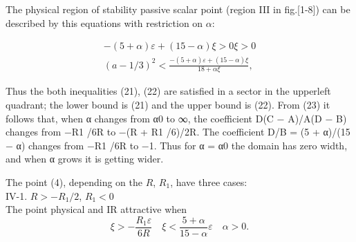 \documentclass[12pt]{article}
\begin{document}
The physical region of stability passive scalar point (region III in fig.[1-8]) can be described 
by this equations with restriction  on $\alpha$:
 

\begin{eqnarray}
-(5+\alpha)\varepsilon +(15-\alpha)\xi>0  \xi>0
\nonumber \\
 (a-1/3)  ^2< \frac{-(5+\alpha)\varepsilon+(15-\alpha)\xi}{18+\alpha \xi},
\label{3pointu}
\end{eqnarray}


Thus the both inequalities (21), (22) are satisﬁed in a sector in the upperleft quadrant; the lower bound is (21) and the upper bound is (22).
From (23) it follows that, when α changes from α0 to ∞, the coeﬃcient
D(C − A)/A(D − B) changes from −R1 /6R to −(R + R1 /6)/2R. The coeﬃcient D/B = (5 + α)/(15 − α) changes from −R1 /6R to −1. Thus for
α = α0 the domain has zero width, and when α grows it is getting wider.

The point (4), depending on the $R$, $R_1$, have three cases:
\\
IV-1. $R>-R_1/2$, $ R_1<0$\\
The point physical and IR attractive when
\begin{equation}
\xi>-\frac{R_1\varepsilon}{6R} \quad \xi<\frac{5+\alpha}{15-\alpha}\varepsilon
\quad \alpha>0.
\label{4-1}
\end{equation}
\end{document}
